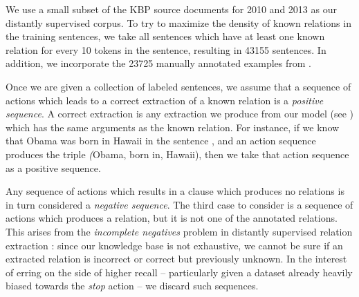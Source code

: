 We use a small subset of the KBP source documents for 
  2010 \cite{key:2010ji-kbpoverview}
  and 2013 \cite{key:2013surdeanu-kbpoverview}
  as our distantly supervised corpus.
To try to maximize the density of known relations in the training sentences,
  we take all sentences which have at least one known
  relation for every 10 tokens in the sentence,
  resulting in \num{43155} sentences.
In addition, we incorporate the \num{23725} manually annotated examples
  from .

Once we are given a collection of labeled sentences, 
  we assume that a sequence of actions which leads to a correct extraction of
  a known relation is a \textit{positive sequence}.
A correct extraction is any extraction we produce from our model
  (see ) which has the same arguments as the known
  relation.
For instance, if we know that Obama was born in Hawaii in the sentence
  , and an action sequence produces the triple
  \textit(Obama, born in, Hawaii), then we take that action sequence as
  a positive sequence.

Any sequence of actions which results in a clause which produces no relations
  is in turn considered a \textit{negative sequence}.
%
The third case to consider is a sequence of actions which produces a relation,
  but it is not one of the annotated relations.
This arises from the \textit{incomplete negatives} problem in distantly
  supervised relation extraction \cite{key:2013min-incomplete}: 
  since our knowledge base is not exhaustive,
  we cannot be sure if an extracted relation is incorrect or correct but
  previously unknown.
In the interest of erring on the side of higher recall -- particularly given
  a dataset already heavily biased towards the \textit{stop} action --
  we discard such sequences.

